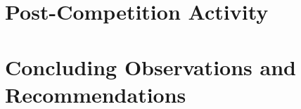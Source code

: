 \documentclass[twoside,11pt]{article}
\begin{document}
\section{Post-Competition Activity}
\label{sec:post}


\section{Concluding Observations and Recommendations}
\label{sec:conclusions}



%
\end{document}
